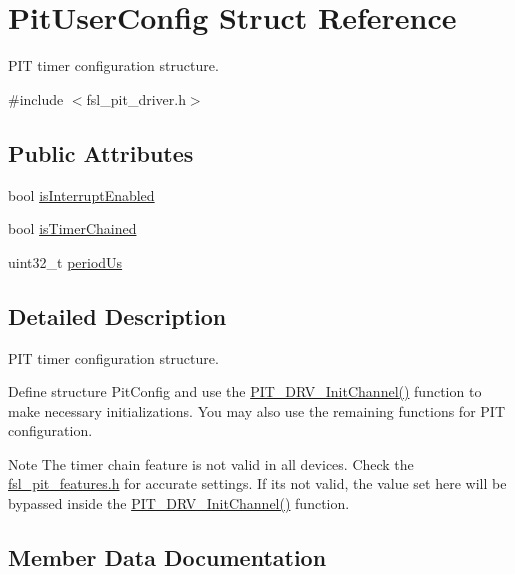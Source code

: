 \hypertarget{structPitUserConfig}{}\section{Pit\+User\+Config Struct Reference}
\label{structPitUserConfig}


P\+IT timer configuration structure.  




{\ttfamily \#include $<$fsl\+\_\+pit\+\_\+driver.\+h$>$}

\subsection*{Public Attributes}
\begin{DoxyCompactItemize}
\item 
bool \hyperlink{structPitUserConfig_a4b622c315927ac9071df740fab8a6d46}{is\+Interrupt\+Enabled}
\item 
bool \hyperlink{structPitUserConfig_ae84953c67b205efb2b1f1a3a66e1f2bb}{is\+Timer\+Chained}
\item 
uint32\+\_\+t \hyperlink{structPitUserConfig_a9a6acd9170268f69e71a6e3822ddda61}{period\+Us}
\end{DoxyCompactItemize}


\subsection{Detailed Description}
P\+IT timer configuration structure. 

Define structure Pit\+Config and use the \hyperlink{group__pit__driver_ga25cbdbfdd630d0e96f7e18b2d03f62a8}{P\+I\+T\+\_\+\+D\+R\+V\+\_\+\+Init\+Channel()} function to make necessary initializations. You may also use the remaining functions for P\+IT configuration.

\begin{DoxyNote}{Note}
The timer chain feature is not valid in all devices. Check the \hyperlink{fsl__pit__features_8h_source}{fsl\+\_\+pit\+\_\+features.\+h} for accurate settings. If it\textquotesingle{}s not valid, the value set here will be bypassed inside the \hyperlink{group__pit__driver_ga25cbdbfdd630d0e96f7e18b2d03f62a8}{P\+I\+T\+\_\+\+D\+R\+V\+\_\+\+Init\+Channel()} function. 
\end{DoxyNote}


\subsection{Member Data Documentation}
